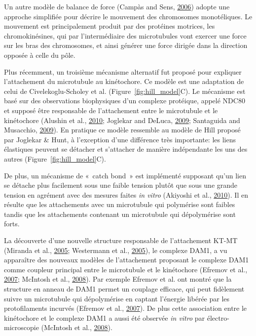 \documentclass[12pt,a4paper,twoside,openright]{book}
\begin{document}
Un autre modèle de balance de force (Campàs and Sens,
\protect\hyperlink{ref-Campas2006}{2006}) adopte une approche simplifiée
pour décrire le mouvement des chromosomes monotéliques. Le mouvement est
principalement produit par des protéines motrices, les chromokinésines,
qui par l'intermédiaire des microtubules vont exercer une force sur les
bras des chromosomes, et ainsi générer une force dirigée dans la
direction opposée à celle du pôle.

Plus récemment, un troisième mécanisme alternatif fut proposé pour
expliquer l'attachement du microtubule au kinétochore. Ce modèle est une
adaptation de celui de Civelekoglu-Scholey et al.
(Figure~\ref{fig:hill_model}C). Le mécanisme est basé sur des
observations biophysiques d'un complexe protéique, appelé NDC80 et
supposé être responsable de l'attachement entre le microtubule et le
kinétochore (Alushin et al., \protect\hyperlink{ref-Alushin2010}{2010};
Joglekar and DeLuca, \protect\hyperlink{ref-Joglekar2009}{2009};
Santaguida and Musacchio,
\protect\hyperlink{ref-Santaguida2009a}{2009}). En pratique ce modèle
ressemble au modèle de Hill proposé par Joglekar \& Hunt, à l'exception
d'une différence très importante: les liens élastiques peuvent se
détacher et s'attacher de manière indépendante les uns des autres
(Figure~\ref{fig:hill_model}C).

De plus, un mécanisme de «~catch bond~» est implémenté supposant qu'un
lien se détache plus facilement sous une faible tension plutôt que sous
une grande tension en agrément avec des mesures faites \emph{in vitro}
(Akiyoshi et al., \protect\hyperlink{ref-Akiyoshi2010}{2010}). Il en
résulte que les attachements avec un microtubule qui polymérise sont
faibles tandis que les attachements contenant un microtubule qui
dépolymérise sont forts.

La découverte d'une nouvelle structure responsable de l'attachement
KT-MT (Miranda et al., \protect\hyperlink{ref-Miranda2005}{2005};
Westermann et al., \protect\hyperlink{ref-Westermann2005}{2005}), le
complexe DAM1, a vu apparaître des nouveaux modèles de l'attachement
proposant le complexe DAM1 comme coupleur principal entre le microtubule
et le kinétochore (Efremov et al.,
\protect\hyperlink{ref-Efremov2007}{2007}; McIntosh et al.,
\protect\hyperlink{ref-McIntosh2008}{2008}). Par exemple Efremov et al.
ont montré que la structure en anneau de DAM1 permet un couplage
efficace, qui peut fidèlement suivre un microtubule qui dépolymérise en
captant l'énergie libérée par les protofilaments incurvés (Efremov et
al., \protect\hyperlink{ref-Efremov2007}{2007}). De plus cette
association entre le kinétochore et le complexe DAM1 a aussi été
observée \emph{in vitro} par électro-microscopie (McIntosh et al.,
\protect\hyperlink{ref-McIntosh2008}{2008}).
\end{document}
